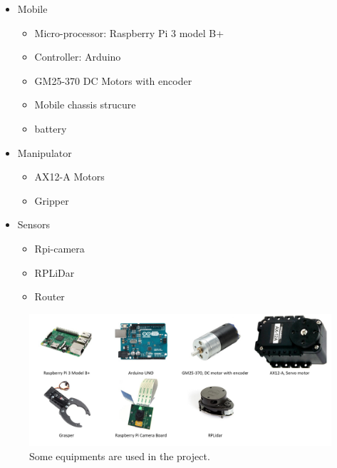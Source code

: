 \documentclass[a4paper, 10pt, conference]{ieeeconf}      %
\begin{document}
\begin{itemize}
\item Mobile

\begin{itemize}
	\item Micro-processor: Raspberry Pi 3 model B+
	\item Controller: Arduino
	\item GM25-370 DC Motors with encoder
	\item Mobile chassis strucure
	\item battery
\end{itemize}

\item Manipulator
\begin{itemize}
	\item AX12-A Motors
	\item Gripper
\end{itemize}

\item Sensors
\begin{itemize}
	\item Rpi-camera
	\item RPLiDar
	\item Router
\end{itemize}

\end{itemize}

\begin{figure}[h]
\includegraphics[width=0.95\columnwidth]{equipment}
\centering
\caption{Some equipments are used in the project.}
\end{figure}

\end{document}
